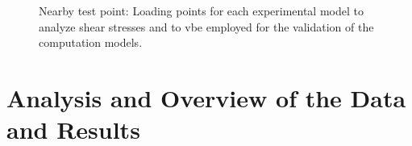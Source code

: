 \begin{figure}%
    \centering
   \qquad
   \caption{Nearby test point: Loading points for each experimental model to analyze shear stresses and to vbe employed for the validation of the computation models.}%
   \label{fig:nbexp}%
\end{figure}



\section{Analysis and Overview of the Data and Results}

